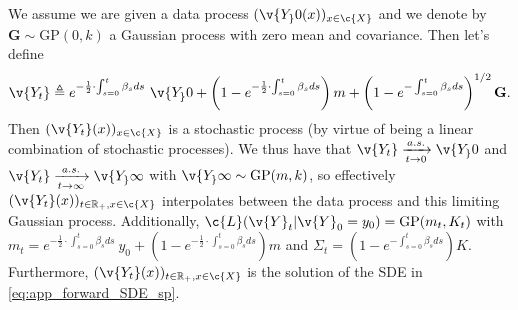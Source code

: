 \begin{proposition}{\parencite{phillips2022spectral}}{} \label{prop:mOU} We assume we are given a data process $(\v{Y_}0(x))_{x \in \c{X}}$ and we denote by $\mathbf{G} \sim \mathrm{GP}(0, k)$ a Gaussian process with zero mean and covariance.
	Then let's define $$\v{Y_t} \triangleq e^{-\frac{1}{2}\cdot \int_{s=0}^t \beta_s ds} ~\v{Y_}0 + \left(1 - e^{-\frac{1}{2}\cdot \int_{s=0}^t \beta_s ds} \right) m + \left(1 - e^{-\int_{s=0}^t \beta_s ds} \right)^{1/2} \mathbf{G}.
	$$
	Then $(\v{Y_t}(x))_{x \in \c{X}}$ is a stochastic process (by virtue of being a linear combination of stochastic processes).
	We thus have that $\v{Y_t} \xrightarrow[t \rightarrow 0]{a.s.
			} \v{Y_}0$ and $\v{Y_t} \xrightarrow[t \rightarrow \infty]{a.s.} \v{Y_}\infty$ with $\v{Y_}\infty \sim \mathrm{GP}(m, k)$, so effectively $(\v{Y_t}(x))_{t \in \R_+, x \in \c{X}}$ interpolates between the data process and this limiting Gaussian process.
	Additionally, $\c{L}({\v{Y}}_t|{\v{Y}}_0=y_0) = \mathrm{GP}(m_t, K_t)$ with $m_t = e^{-\frac{1}{2}\cdot \int_{s=0}^t \beta_s ds} ~y_0 + \left(1 - e^{-\frac{1}{2}\cdot \int_{s=0}^t \beta_s ds} \right) m $ and $\Sigma_t = \left(1 - e^{-\int_{s=0}^t \beta_s ds} \right) {K}$.
	Furthermore, $(\v{Y_t}(x))_{t \in \R_+, x \in \c{X}}$ is the solution of the SDE in \eqref{eq:app_forward_SDE_sp}.
\end{proposition}

